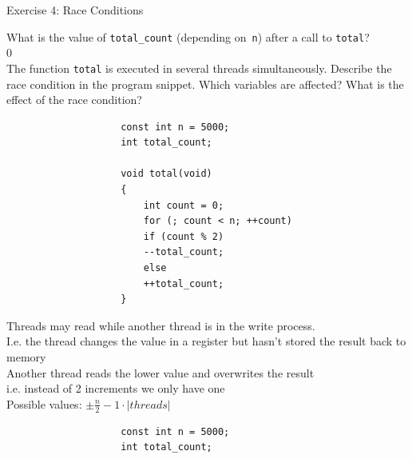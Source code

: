 \documentclass[10pt]{beamer}
\begin{document}
        \begin{frame}{Exercise 4: Race Conditions}
            \begin{minipage}[t]{0.5\linewidth-\tabcolsep}
                What is the value of \texttt{total_count} (depending on~\texttt{n}) after a call to \texttt{total}? \\
                \alert{$0$} \vspace{0.5cm} \\

                The function \texttt{total} is executed in several threads simultaneously.
                Describe the race condition in the program snippet. Which variables are affected? What is the effect of the race condition?
            \end{minipage}%
            \hfill%
            \begin{minipage}[t]{0.5\linewidth-2\tabcolsep}
                \begin{verbatim}
                    const int n = 5000;
                    int total_count;

                    void total(void)
                    {
                        int count = 0;
                        for (; count < n; ++count)
                        if (count % 2)
                        --total_count;
                        else
                        ++total_count;
                    }
                \end{verbatim}
            \end{minipage}
            \framebreak

            \begin{minipage}[t]{0.4\linewidth-\tabcolsep}
                \alert{Threads may read while another thread is in the write process. \\
                I.e. the thread changes the value in a register but hasn't stored the result back to memory \\
                Another thread reads the lower value and overwrites the result\\
                i.e. instead of 2 increments we only have one \\
                Possible values: $\pm \frac{n}{2} - 1 \cdot |threads|$}
            \end{minipage}%
            \hfill%
            \begin{minipage}[t]{0.5\linewidth-2\tabcolsep}
                \begin{verbatim}
                    const int n = 5000;
                    int total_count;


\end{verbatim}
\end{minipage}
\end{frame}
\end{document}
